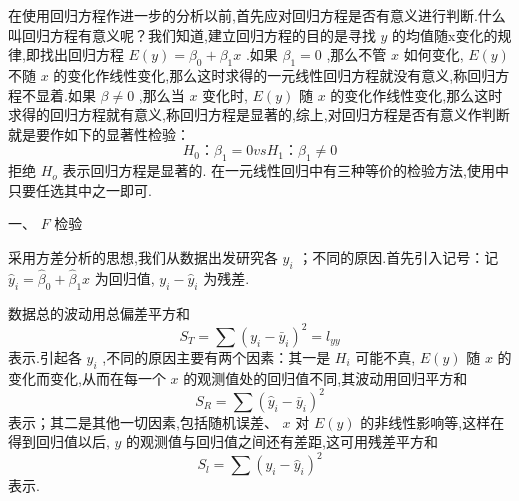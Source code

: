 在使用回归方程作进一步的分析以前,首先应对回归方程是否有意义进行判断.什么叫回归方程有意义呢？我们知道,建立回归方程的目的是寻找 $ y  $ 的均值随x变化的规律,即找出回归方程 $ E\left( y \right) =\beta _0+\beta _1x  $ .如果 $ \beta_1=0  $ ,那么不管 $ x  $ 如何变化, $ E(y)  $ 不随 $ x  $ 的变化作线性变化,那么这时求得的一元线性回归方程就没有意义,称回归方程不显着.如果 $ \beta\neq 0 $ ,那么当 $ x $ 变化时, $ E(y) $ 随 $ x $ 的变化作线性变化,那么这时求得的回归方程就有意义,称回归方程是显著的,综上,对回归方程是否有意义作判断就是要作如下的显著性检验：
\[
H_0：\beta_1=0 vs H_1：\beta_1\neq 0
\]
拒绝 $ H_o $ 表示回归方程是显著的.
在一元线性回归中有三种等价的检验方法,使用中只要任选其中之一即可.

一、 $ F $ 检验

采用方差分析的思想,我们从数据出发研究各 $ y_i $ ；不同的原因.首先引入记号：记 $ \hat{y}_i=\hat{\beta}_0+\hat{\beta}_1x $ 为回归值, $ y_i-\hat{y}_i $ 为残差. 

数据总的波动用总偏差平方和
\begin{equation}
S_T=\sum{\left( y_i-\bar{y}_i \right) ^2=l_{yy}} \label{eq:8.4.10}
\end{equation}
表示.引起各 $ y_i $ ,不同的原因主要有两个因素：其一是 $ H_i $ 可能不真, $ E(y) $ 随 $ x $ 的变化而变化,从而在每一个 $ x $ 的观测值处的回归值不同,其波动用回归平方和
\begin{equation}
S_R=\sum{\left( \hat{y}_i-\bar{y}_i \right)}^2 \label{eq:8.4.11}	
\end{equation}
表示；其二是其他一切因素,包括随机误差、 $ x $ 对 $ E(y) $ 的非线性影响等,这样在得到回归值以后, $ y $ 的观测值与回归值之间还有差距,这可用残差平方和
\begin{equation}
S_l=\sum{\left( y_i-\hat{y}_i \right)}^2	
\end{equation}
表示.

